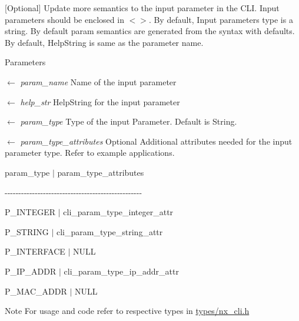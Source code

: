 \mbox{[}Optional\mbox{]} Update more semantics to the input parameter in the CLI. Input parameters should be enclosed in $<$$>$. By default, Input parameters type is a string. By default param semantics are generated from the syntax with defaults. By default, HelpString is same as the parameter name. 
\begin{DoxyParams}{Parameters}
\item[\mbox{$\leftarrow$} {\em param\_\-name}]Name of the input parameter \item[\mbox{$\leftarrow$} {\em help\_\-str}]HelpString for the input parameter \item[\mbox{$\leftarrow$} {\em param\_\-type}]Type of the input Parameter. Default is String. \item[\mbox{$\leftarrow$} {\em param\_\-type\_\-attributes}]Optional Additional attributes needed for the input parameter type. Refer to example applications. \par
 param\_\-type $|$ param\_\-type\_\-attributes \par
 -\/-\/-\/-\/-\/-\/-\/-\/-\/-\/-\/-\/-\/-\/-\/-\/-\/-\/-\/-\/-\/-\/-\/-\/-\/-\/-\/-\/-\/-\/-\/-\/-\/-\/-\/-\/-\/-\/-\/-\/-\/-\/-\/-\/-\/-\/-\/-\/-\/-\/ \par
 P\_\-INTEGER $|$ cli\_\-param\_\-type\_\-integer\_\-attr \par
 P\_\-STRING $|$ cli\_\-param\_\-type\_\-string\_\-attr \par
 P\_\-INTERFACE $|$ NULL \par
 P\_\-IP\_\-ADDR $|$ cli\_\-param\_\-type\_\-ip\_\-addr\_\-attr \par
 P\_\-MAC\_\-ADDR $|$ NULL \par
\par
\end{DoxyParams}
\begin{DoxyNote}{Note}
For usage and code refer to respective types in \hyperlink{types_2nx__cli_8h_source}{types/nx\_\-cli.h} 
\end{DoxyNote}

